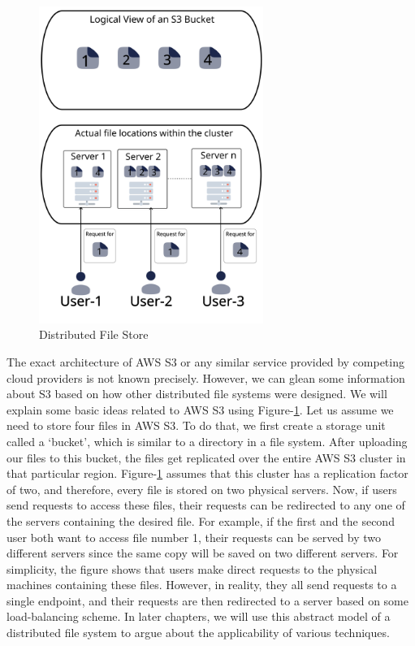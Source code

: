\begin{figure}[ht]
    \centering
    \includegraphics[width=0.65\textwidth]{figures/distributedCloudStorage.png}
    \caption{Distributed File Store}
    \label{fig:distFileStore}
\end{figure}

\medskip
The exact architecture of AWS S3 or any similar service provided by
competing cloud providers is not known precisely. However, we can glean some information
about S3 based on
how other distributed file systems were designed. We will explain some basic ideas
related to AWS S3 using Figure-\ref{fig:distFileStore}. Let us assume we need to
store four files in AWS S3. To do that, we first create a storage unit
called a `bucket', which is similar to a directory in a file system. After
uploading our files to this bucket, the files get replicated over the entire AWS S3 cluster in
that particular region. Figure-\ref{fig:distFileStore} assumes that this cluster
has a replication factor of two, and therefore, every file is stored on two
physical servers. Now, if users send requests to access these files, their
requests can be redirected to any one of the servers containing the desired file. For
example, if the first and the second user both want to access file number 1, their
requests can be served by two different servers since the same copy will be
saved on two different servers. For simplicity, the figure shows that users make
direct requests to the physical machines containing these files. However, in
reality, they all send requests to a single endpoint, and their requests are then
redirected to a server based on some load-balancing scheme. In later chapters,
we will use this abstract model of a distributed file system to argue about the
applicability of various techniques.

